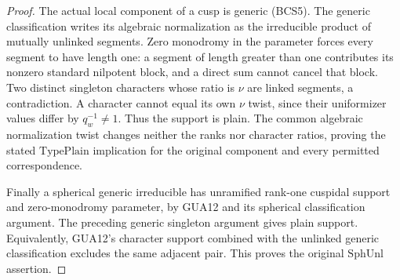 \begin{proof}
The actual local component of a cusp is generic (BCS5).
The generic classification writes its algebraic normalization
as the irreducible product of mutually unlinked segments.
Zero monodromy in the parameter forces every segment to have
length one: a segment of length greater than one contributes
its nonzero standard nilpotent block, and a direct sum cannot
cancel that block.  Two distinct singleton characters whose
ratio is $\nu$ are linked segments, a contradiction.  A
character cannot equal its own $\nu$ twist, since their
uniformizer values differ by $q_w^{-1}\ne1$.
Thus the support is plain.  The common algebraic normalization
twist changes neither the ranks nor character ratios, proving
the stated $\mathrm{TypePlain}$ implication for the original
component and every permitted correspondence.

Finally a spherical generic irreducible has unramified
rank-one cuspidal support and zero-monodromy parameter, by
GUA12 and its spherical classification argument.  The preceding
generic singleton argument gives plain support.  Equivalently,
GUA12's character support combined with the unlinked generic
classification excludes the same adjacent pair.  This proves
the original $\mathrm{SphUnl}$ assertion.
\end{proof}

